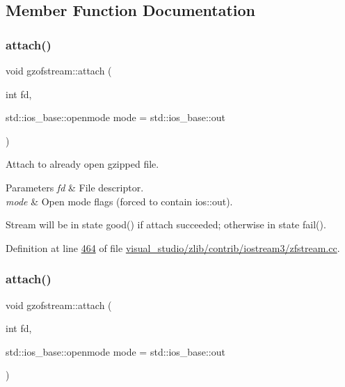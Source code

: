 \subsection{Member Function Documentation}
\mbox{\label{classgzofstream_a95b76eaecd03b6cbf53d2f4b1c867439}} 
\subsubsection{\texorpdfstring{attach()}{attach()}\hspace{0.1cm}{\footnotesize\ttfamily [1/2]}}
{\footnotesize\ttfamily void gzofstream\+::attach (\begin{DoxyParamCaption}\item[{int}]{fd,  }\item[{std\+::ios\+\_\+base\+::openmode}]{mode = {\ttfamily std\+:\+:ios\+\_\+base\+:\+:out} }\end{DoxyParamCaption})}



Attach to already open gzipped file. 


\begin{DoxyParams}{Parameters}
{\em fd} & File descriptor. \\
\hline
{\em mode} & Open mode flags (forced to contain ios\+::out).\\
\hline
\end{DoxyParams}
Stream will be in state good() if attach succeeded; otherwise in state fail(). 

Definition at line \hyperlink{visual__studio_2zlib_2contrib_2iostream3_2zfstream_8cc_source_l00464}{464} of file \hyperlink{visual__studio_2zlib_2contrib_2iostream3_2zfstream_8cc_source}{visual\+\_\+studio/zlib/contrib/iostream3/zfstream.\+cc}.

\mbox{\label{classgzofstream_a95b76eaecd03b6cbf53d2f4b1c867439}} 
\subsubsection{\texorpdfstring{attach()}{attach()}\hspace{0.1cm}{\footnotesize\ttfamily [2/2]}}
{\footnotesize\ttfamily void gzofstream\+::attach (\begin{DoxyParamCaption}\item[{int}]{fd,  }\item[{std\+::ios\+\_\+base\+::openmode}]{mode = {\ttfamily std\+:\+:ios\+\_\+base\+:\+:out} }\end{DoxyParamCaption})}



